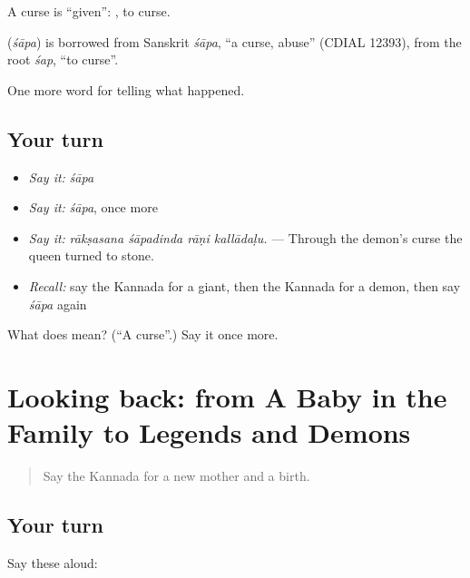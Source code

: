 A curse is \textquotedblleft{}given\textquotedblright{}:  , to curse.

\begin{cousinweb}
\textbf{} (\emph{śāpa}) is borrowed from Sanskrit \emph{śāpa}, \textquotedblleft{}a curse, abuse\textquotedblright{} (CDIAL 12393), from the root \emph{śap}, \textquotedblleft{}to curse\textquotedblright{}.
\end{cousinweb}

\begin{grammarlens}[title={What you've built}]
One more word for telling what happened.
\end{grammarlens}

\subsection*{Your turn}
\begin{itemize}
\raggedright
  \item \emph{Say it:} \emph{śāpa}
  \item \emph{Say it:} \emph{śāpa}, once more
  \item \emph{Say it:} \emph{rākṣasana śāpadinda rāṇi kallādaḷu.} — Through the demon's curse the queen turned to stone.
  \item \emph{Recall:} say the Kannada for a giant, then the Kannada for a demon, then say \emph{śāpa} again
\end{itemize}

\begin{tcolorbox}[breakable,colback=teal!4,colframe=teal!35!black,title={Before you move on}]
What does  mean? (\textquotedblleft{}A curse\textquotedblright{}.) Say it once more.
\end{tcolorbox}
\section[(dialogue)]{Looking back: from A Baby in the Family to Legends and Demons}

\label{lesson:KA-R340-review-334-340}



\begin{quote}
Say the Kannada for a new mother and a birth.
\end{quote}

\subsection*{Your turn}
Say these aloud:

